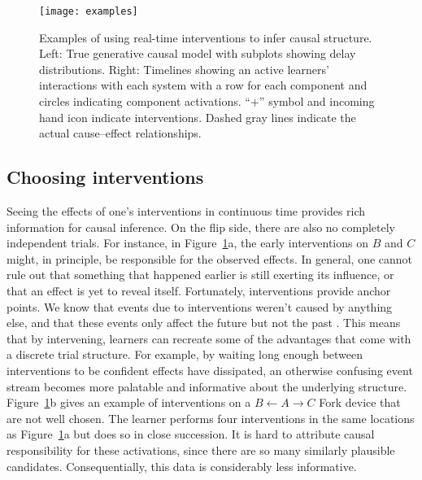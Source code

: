 \documentclass[10pt,letterpaper]{article}
\begin{document}
\begin{figure}[t]
   \centering
   \texttt{[image: examples]}
   \caption{Examples of using real-time interventions to infer causal structure. Left: True generative causal model with subplots showing delay distributions. Right: Timelines showing an active learners' interactions with each system with a row for each component and circles indicating component activations.  ``+'' symbol and incoming hand icon indicate interventions.  Dashed gray lines indicate the actual cause--effect relationships.}
   \vspace{-0.6cm}
   \label{fig:examples}
\end{figure}


\subsection{Choosing interventions}

Seeing the effects of one's interventions in continuous time provides rich information for causal inference. On the flip side, there are also no completely independent trials. 
For instance, in Figure~\ref{fig:examples}a, the early interventions on $B$ and $C$ might, in principle, be responsible for the observed effects.  In general, one cannot rule out that something that happened earlier is still exerting its influence, or that an effect is yet to reveal itself.  Fortunately, interventions provide anchor points. We know that events due to interventions weren't caused by anything else, and that these events only affect the future but not the past \citep{lagnado2004advantage}. 
This means that by intervening, learners can recreate some of the advantages that come with a discrete trial structure.  
For example, by waiting long enough between interventions to be confident effects have dissipated, an otherwise confusing event stream becomes more palatable and informative about the underlying structure. 
Figure~\ref{fig:examples}b gives an example of interventions on a $B\leftarrow  A\rightarrow C$ Fork device that are not well chosen.  The learner performs four interventions in the same locations as Figure~\ref{fig:examples}a but does so in close succession. It is hard to attribute causal responsibility for these activations, since there are so many similarly plausible candidates. Consequentially, this data is considerably less informative.
\end{document}
